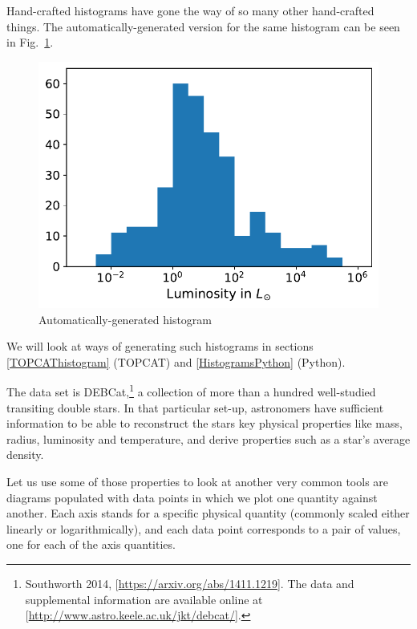 \documentclass[twocolumn,apj]{openjournal}
\begin{document}
Hand-crafted histograms have gone the way of so many other hand-crafted things. The automatically-generated version for the same histogram can be seen in Fig.~\ref{HistogrammLeuchtkraft}.
\begin{figure}[htbp]
\begin{center}
\includegraphics[width=0.8\linewidth]{lum-distribution-DEB.pdf}
\caption{Automatically-generated histogram}
\label{HistogrammLeuchtkraft}
\end{center}
\end{figure}
We will look at ways of generating such histograms in sections \ref{TOPCAThistogram} (TOPCAT) and \ref{HistogramsPython} (Python). 

The data set is DEBCat,\footnote{Southworth 2014, [\href{https://arxiv.org/abs/1411.1219}{https://arxiv.org/abs/1411.1219}]. The data and supplemental information are available online at [\href{http://www.astro.keele.ac.uk/jkt/debcat/}{http://www.astro.keele.ac.uk/jkt/debcat/}].} a collection of more than a hundred well-studied transiting double stars. In that particular set-up, astronomers have sufficient information to be able to reconstruct the stars key physical properties like mass, radius, luminosity and temperature, and derive properties such as a star's average density. 

Let us use some of those properties to look at another very common tools are diagrams populated with data points in which we plot one quantity against another. Each axis stands for a specific physical quantity (commonly scaled either linearly or logarithmically), and each data point corresponds to a pair of values, one for each of the axis quantities.
\end{document}
